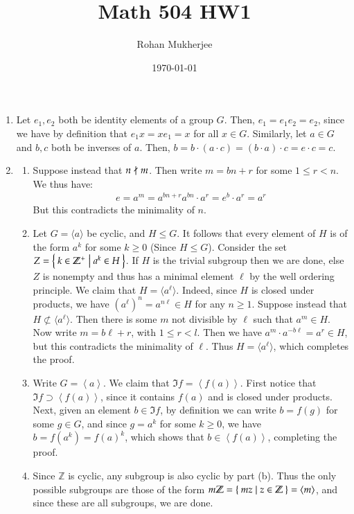 \documentclass[12pt]{article}
\title{Math 504 HW1}
\date{\today}
\author{Rohan Mukherjee}
\theoremstyle{definitionstyle}
\def\mbb#1{\mathbb{#1}}
\newcommand{\Z}{\mbb Z}
\newcommand{\gen}[1]{\left\langle #1 \right\rangle}
\begin{document}
	\maketitle
	\begin{enumerate}[leftmargin=\labelsep]
		\item Let $e_1, e_2$ both be identity elements of a group $G$. Then, $e_1 = e_1e_2 = e_2$, since we have by definition that $e_1x = xe_1 = x$ for all $x \in G$. Similarly, let $a \in G$ and $b, c$ both be inverses of $a$. Then, $b = b \cdot (a \cdot c) = (b \cdot a) \cdot c = e \cdot c = c$.
		
		\item \begin{enumerate}
			\item Suppose instead that $n \not \mid m$. Then write $m = bn + r$ for some $1 \leq r < n$. We thus have:
			\begin{align*}
				e = a^m = a^{bn + r} a^{bn} \cdot a^r = e^b \cdot a^r = a^r
			\end{align*}
			But this contradicts the minimality of $n$.
			\item Let $G = \langle a \rangle$ be cyclic, and $H \leq G$. It follows that every element of $H$ is of the form $a^{k}$ for some $k \geq 0$ (Since $H \leq G$). Consider the set $Z = \Set{k \in \Z^+ | a^k \in H}$. If $H$ is the trivial subgroup then we are done, else $Z$ is nonempty and thus has a minimal element $\ell$ by the well ordering principle. We claim that $H = \langle a^\ell \rangle$. Indeed, since $H$ is closed under products, we have $(a^\ell)^n = a^{n \ell} \in H$ for any $n \geq 1$. Suppose instead that $H \not \subset \langle a^\ell \rangle$. Then there is some $m$ not divisible by $\ell$ such that $a^m \in H$. Now write $m = b\ell + r$, with $1 \leq r < l$. Then we have $a^m \cdot a^{-b\ell} = a^r \in H$, but this contradicts the minimality of $\ell$. Thus $H = \langle a^\ell \rangle$, which completes the proof.
			\item Write $G = \gen{a}$. We claim that $\Im{f} = \gen{f(a)}$. First notice that $\Im{f} \supset \gen{f(a)}$, since it contains $f(a)$ and is closed under products. Next, given an element $b \in \Im{f}$, by definition we can write $b = f(g)$ for some $g \in G$, and since $g = a^k$ for some $k \geq 0$, we have $b = f(a^k) = f(a)^k$, which shows that $b \in \gen{f(a)}$, completing the proof.
			\item Since $\Z$ is cyclic, any subgroup is also cyclic by part (b). Thus the only possible subgroups are those of the form $m\Z = \Set{mz | z \in \Z} = \gen{m}$, and since these are all subgroups, we are done.

\end{enumerate}
\end{enumerate}
\end{document}
